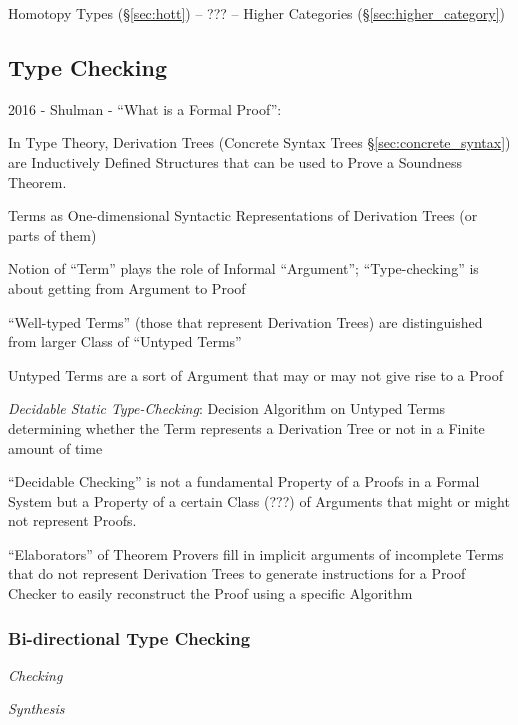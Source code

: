 Homotopy Types (\S\ref{sec:hott}) -- ??? -- Higher Categories
(\S\ref{sec:higher_category})



\subsection{Type Checking}\label{sec:type_checking}

2016 - Shulman - ``What is a Formal Proof'': %

In Type Theory, Derivation Trees (Concrete Syntax Trees
\S\ref{sec:concrete_syntax}) are Inductively Defined Structures that
can be used to Prove a Soundness Theorem.

Terms as One-dimensional Syntactic Representations of Derivation Trees
(or parts of them)

Notion of ``Term'' plays the role of Informal ``Argument'';
``Type-checking'' is about getting from Argument to Proof

``Well-typed Terms'' (those that represent Derivation Trees) are
distinguished from larger Class of ``Untyped Terms''

Untyped Terms are a sort of Argument that may or may not give rise to
a Proof

\emph{Decidable Static Type-Checking}: Decision Algorithm on Untyped
Terms determining whether the Term represents a Derivation Tree or not
in a Finite amount of time

``Decidable Checking'' is not a fundamental Property of a Proofs in a
Formal System but a Property of a certain Class (???) of Arguments
that might or might not represent Proofs.

``Elaborators'' of Theorem Provers fill in implicit arguments of
incomplete Terms that do not represent Derivation Trees to generate
instructions for a Proof Checker to easily reconstruct the Proof using
a specific Algorithm



\subsubsection{Bi-directional Type Checking}
\label{sec:bidirectional_checking}

\emph{Checking}

\emph{Synthesis}



